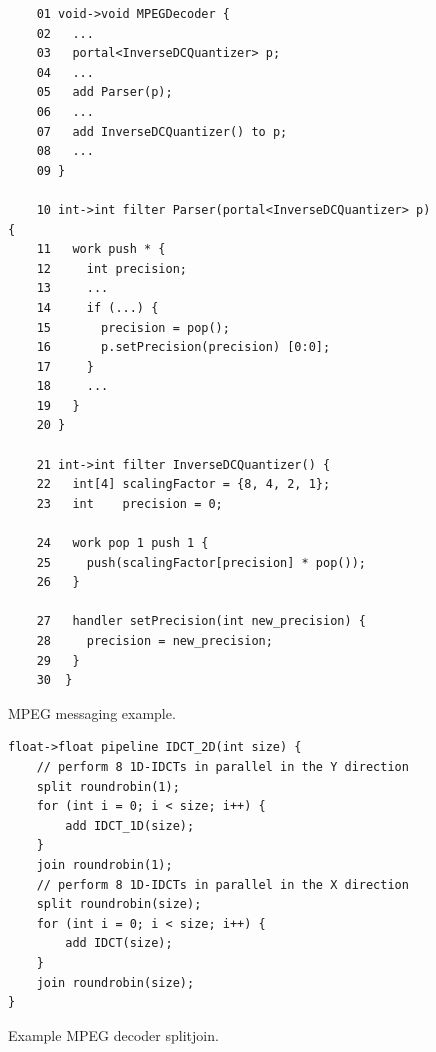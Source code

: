 
\begin{figure}[t]
  \begin{scriptsize}
    \begin{verbatim}
	01 void->void MPEGDecoder {
	02   ...
	03   portal<InverseDCQuantizer> p;
	04   ...
	05   add Parser(p);
	06   ...
	07   add InverseDCQuantizer() to p;
	08   ...
	09 }

	10 int->int filter Parser(portal<InverseDCQuantizer> p) {
	11   work push * {
	12     int precision;
	13     ...
	14     if (...) {
	15       precision = pop();
	16       p.setPrecision(precision) [0:0];
	17     }
	18     ...
	19   }
	20 }

	21 int->int filter InverseDCQuantizer() {
	22   int[4] scalingFactor = {8, 4, 2, 1};
	23   int    precision = 0;

	24   work pop 1 push 1 {
	25     push(scalingFactor[precision] * pop());
	26   }

	27   handler setPrecision(int new_precision) {
	28     precision = new_precision;
	29   }
	30  }
    \end{verbatim}
  \end{scriptsize}
  \caption{MPEG messaging example.}
  \label{fig:messaging}
\end{figure}

\begin{figure}[t]
  \begin{scriptsize}
    \begin{verbatim}
float->float pipeline IDCT_2D(int size) {
    // perform 8 1D-IDCTs in parallel in the Y direction
    split roundrobin(1);
    for (int i = 0; i < size; i++) {
        add IDCT_1D(size);
    }
    join roundrobin(1);
    // perform 8 1D-IDCTs in parallel in the X direction
    split roundrobin(size);
    for (int i = 0; i < size; i++) {
        add IDCT(size);
    }
    join roundrobin(size);
}
    \end{verbatim}
  \end{scriptsize}
  \vspace{-12pt}
  \caption{Example MPEG decoder splitjoin.}
  \label{fig:decoder-sj}
\end{figure}


